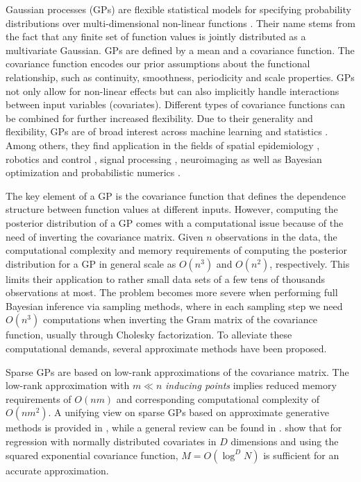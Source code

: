 \documentclass[onecolumn,a4paper,11pt]{article}
\begin{document}
Gaussian processes (GPs) are flexible statistical models for specifying probability distributions over multi-dimensional non-linear functions \citep{rasmussen2006gaussian,neal1997monte}. Their name stems from the fact that any finite set of function values is jointly distributed as a multivariate Gaussian. GPs are defined by a mean and a covariance function. The covariance function encodes our prior assumptions about the functional relationship, such as continuity, smoothness, periodicity and scale properties. GPs not only allow for non-linear effects but can also implicitly handle interactions between input variables (covariates). Different types of covariance functions can be combined for further increased flexibility. Due to their generality and flexibility, GPs are of broad interest across machine learning and statistics \citep{rasmussen2006gaussian,neal1997monte}. Among others, they find application in the fields of spatial epidemiology \citep{diggle2013statistical,carlin2014hierarchical}, robotics and control \citep{deisenroth2015gaussian}, signal processing \citep{sarkka2013spatiotemporal}, neuroimaging \citep{andersen2017} as well as Bayesian optimization and probabilistic numerics \citep{roberts2010bayesian,briol2015probabilistic,hennig2015probabilistic}.

The key element of a GP is the covariance function that defines the dependence structure between function values at different inputs. However, computing the posterior distribution of a GP comes with a computational issue because of the need of inverting the covariance matrix. Given $n$ observations in the data, the computational complexity and memory requirements of computing the posterior distribution for a GP in general scale as $O(n^3)$ and $O(n^2)$, respectively. This limits their application to rather small data sets of a few tens of thousands observations at most. The problem becomes more severe when performing full Bayesian inference via sampling methods, where in each sampling step we need $O(n^3)$ computations when inverting the Gram matrix of the covariance function, usually through Cholesky factorization. To alleviate these computational demands, several approximate methods have been proposed. 

Sparse GPs are based on low-rank approximations of the covariance matrix. The low-rank approximation with $m \ll n$ {\it inducing points} implies reduced memory requirements of $O(nm)$ and corresponding computational complexity of $O(nm^2)$.
A unifying view on sparse GPs based on approximate generative methods
is provided in \cite{quinonero2005unifying}, while a general review
can be found in \cite{rasmussen2006gaussian}. \citet{Burt+Rasmussen+vanderWilk:2019} show that for regression with normally distributed covariates in $D$ dimensions and using the squared exponential covariance function, $M=O(\log^DN)$ is sufficient for an accurate approximation.
\end{document}
